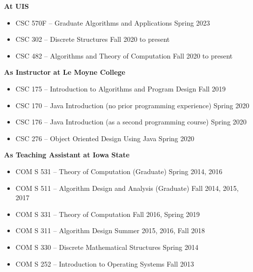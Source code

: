 \documentclass[10pt]{article}
\begin{document}
\textbf{At UIS}
\begin{itemize}
  \item[] CSC 570F -- Graduate Algorithms and Applications \hfill {Spring 2023}
  \item[] CSC 302 -- Discrete Structures \hfill {Fall 2020 to present}
  \item[] CSC 482 -- Algorithms and Theory of Computation \hfill {Fall 2020 to present}
\end{itemize}

\textbf{As Instructor at Le Moyne College}
\begin{itemize}
\item[] CSC 175 -- Introduction to Algorithms and Program Design \hfill {Fall 2019}
\item[] CSC 170 -- Java Introduction (no prior programming experience) \hfill {Spring 2020}
\item[] CSC 176 -- Java Introduction (as a second programming course) \hfill {Spring 2020}
\item[] CSC 276 -- Object Oriented Design Using Java \hfill {Spring 2020}
\end{itemize}

\textbf{As Teaching Assistant at Iowa State}
\begin{itemize}
\item[] COM S 531 -- Theory of Computation (Graduate) \hfill {Spring 2014, 2016}
\item[] COM S 511 -- Algorithm Design and Analysis (Graduate) \hfill {Fall 2014, 2015, 2017}
\item[] COM S 331 -- Theory of Computation \hfill {Fall 2016, Spring 2019}
\item[] COM S 311 -- Algorithm Design \hfill {Summer 2015, 2016, Fall 2018}
\item[] COM S 330 -- Discrete Mathematical Structures \hfill {Spring 2014}
\item[] COM S 252 -- Introduction to Operating Systems \hfill {Fall 2013}
\end{itemize}
\end{document}
